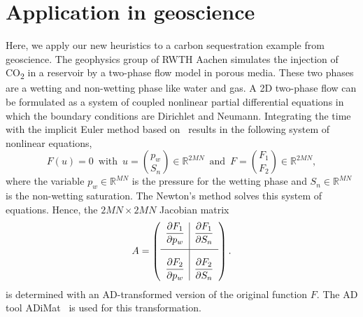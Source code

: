\documentclass[12pt, twoside,a4paper,toc=bibliography]{scrbook}
\newcommand{\field}[1]{\mathbb{#1}}
\newcommand{\R}{\ensuremath{\field{R}}}
\begin{document}


\clearpage
\section{Application in geoscience}
\label{s.application}
Here, we apply our new heuristics to a carbon sequestration example from geoscience.
The geophysics group of RWTH Aachen simulates the injection of CO\textsubscript{2}
in a reservoir by a two-phase flow model in porous media. These two phases are a wetting
and non-wetting phase like water and gas. A 2D two-phase flow can be formulated as
a system of coupled nonlinear partial differential equations in which the boundary conditions
are Dirichlet and Neumann. Integrating the time with the implicit Euler method
based on~\cite{Busing2014UEJ,Lulfesmann2012Fap} results in the following system of nonlinear equations,
$$F(u)=0 \, \text{ with } \, u = \binom{p_w}{S_n} \in \R^{2MN} \, \text{ and } \, F = \binom{F_1}{F_2} \in \R^{2MN},$$
where the variable $p_w \in \R^{MN}$ is the pressure for the wetting phase and $S_n \in \R^{MN}$ is the non-wetting saturation. The Newton's method solves this system of equations.
Hence, the $2MN \times 2MN$ Jacobian matrix
$$
A =
\left({\begin{array}{l|l}
	\displaystyle \frac{\partial F_1}{\partial p_w} & \displaystyle \frac{\partial F_1}{\partial S_n} \\[1em]
	\hline
	\displaystyle \frac{\partial F_2}{\partial p_w} \rule[-7.5pt]{0pt}{30pt} & \displaystyle \frac{\partial F_2}{\partial S_n} \\
 \end{array}} \right).
$$
is determined with an AD-transformed version of the original function $F$. The AD tool \mbox{ADiMat}~\cite{Bischof2002CST,Willkomm2014ANU} is used for this transformation.
\end{document}
